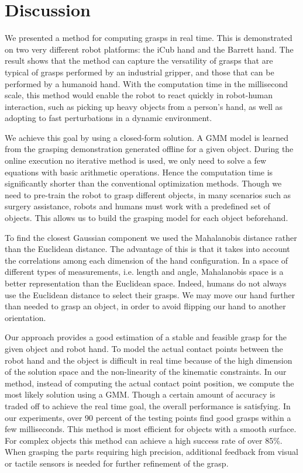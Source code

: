 \section{Discussion}
\label{cha3:sec6:discussion}

We presented a method for computing grasps in real time. This is demonstrated on two very different robot platforms: the iCub hand and the Barrett hand. The result shows that the method can capture the versatility of grasps that are typical of grasps performed by an industrial gripper, and those that can be performed by a humanoid hand.
With the computation time in the millisecond scale,
this method would enable the robot to react quickly in robot-human interaction, such as picking up heavy objects from a person's hand, as well as adopting to fast perturbations in a dynamic environment.

We achieve this goal by using a closed-form solution. A GMM model is learned from the grasping demonstration generated offline for a given object. During the online execution no iterative method is used, we only need to solve a few equations with basic arithmetic operations. Hence the computation time is significantly shorter than the conventional optimization methods. Though we need to pre-train the robot to grasp different objects, in many scenarios such as surgery assistance, robots and humans must work with a predefined set of objects. This allows us to build the grasping model for each object beforehand.


To find the closest Gaussian component we used the Mahalanobis distance rather than the Euclidean distance. The advantage of this is that it takes into account the correlations among each dimension of the hand configuration. In a space of different types of measurements, i.e. length and angle, Mahalanobis space is a better representation than the Euclidean space. Indeed, humans do not always use the Euclidean distance to select their grasps. We may move our hand further than needed to grasp an object, in order to avoid flipping our hand to another orientation.

Our approach provides a good estimation of a stable and feasible grasp for the given object and robot hand. To model the actual contact points between the robot hand and the object is difficult in real time because of the high dimension of the solution space and the non-linearity of the kinematic constraints. In our method, instead of computing the actual contact point position, we compute the most likely solution using a GMM. Though a certain amount of accuracy is traded off to achieve the real time goal, the overall performance is satisfying. In our experiments, over 90 percent of the testing points find good grasps within a few milliseconds. This method is most efficient for objects with a smooth surface. For complex objects this method can achieve a high success rate of over 85\%. When grasping the parts requiring high precision, additional feedback from visual or tactile sensors is needed for further refinement of the grasp.

